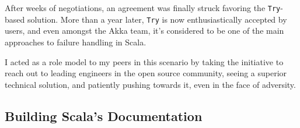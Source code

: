 \documentclass[acmtocl]{acmtrans2m}
\begin{document}
After weeks of negotiations, an agreement was finally struck favoring the
\verb|Try|-based solution. More than a year later, \verb|Try| is now
enthusiastically accepted by users, and even amongst the Akka team, it's
considered to be one of the main approaches to failure handling in Scala.

I acted as a role model to my peers in this scenario by taking the initiative
to reach out to leading engineers in the open source community, seeing a
superior technical solution, and patiently pushing towards it, even in the
face of adversity.











\vspace{-0.1in}
\subsection*{\textbf{Building Scala's Documentation}}
\vspace{-0.1in}
\end{document}
